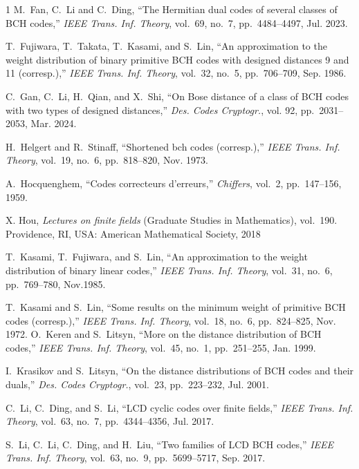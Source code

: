 \documentclass[journal,onecolumn]{IEEEtran}
\begin{document}
\begin{thebibliography}{1}
M.~Fan, C.~Li and C.~Ding, ``The Hermitian dual codes of several classes of
BCH codes,'' {\em IEEE Trans. Inf. Theory}, vol.~69, no.~7,
  pp.~4484--4497, Jul. 2023.



T.~Fujiwara, T.~Takata, T.~Kasami, and S.~Lin, ``An approximation to the weight
  distribution of binary primitive BCH codes with designed distances 9 and 11
  (corresp.),'' {\em IEEE Trans. Inf. Theory}, vol.~32, no.~5,
  pp.~706--709, Sep. 1986.

C.~Gan, C.~Li, H.~Qian, and X.~Shi, ``On Bose distance of a class of BCH codes
  with two types of designed distances,'' {\em Des. Codes Cryptogr.}, vol. 92, pp.~2031--2053, Mar. 2024.


     

H.~Helgert and R.~Stinaff, ``Shortened bch codes (corresp.),'' {\em IEEE Trans. Inf. Theory}, vol.~19, no.~6, pp.~818--820, Nov. 1973.

A.~Hocquenghem, ``Codes correcteurs d'erreurs,'' {\em Chiffers}, vol.~2,
  pp.~147--156, 1959.


X.  Hou, {\em Lectures on finite fields} (Graduate Studies in Mathematics), vol.~190.
Providence, RI, USA: American Mathematical Society, 2018



T.~Kasami, T.~Fujiwara, and S.~Lin, ``An approximation to the weight
  distribution of binary linear codes,'' {\em IEEE Trans. Inf. Theory}, vol.~31, no.~6, pp.~769--780, Nov.1985.

T.~Kasami and S.~Lin, ``Some results on the minimum weight of primitive BCH 
  codes (corresp.),'' {\em IEEE Trans. Inf. Theory}, vol.~18,
  no.~6, pp.~824--825, Nov. 1972.
O.~Keren and S.~Litsyn, ``More on the distance distribution of BCH codes,''
  {\em IEEE Trans. Inf. Theory}, vol.~45, no.~1, pp.~251--255,
  Jan. 1999.

I.~Krasikov and S.~Litsyn, ``On the distance distributions of BCH codes and
  their duals,'' {\em Des. Codes Cryptogr.}, vol.~23, pp.~223--232,
 Jul. 2001.




C.~Li, C.~Ding, and S.~Li, ``LCD cyclic codes over finite fields,'' {\em IEEE Trans. Inf. Theory}, vol.~63, no.~7, pp.~4344--4356, Jul. 2017.

S.~Li, C.~Li, C.~Ding, and H.~Liu, ``Two families of LCD BCH codes,'' {\em IEEE Trans. Inf. Theory}, vol.~63, no.~9, pp.~5699--5717, Sep. 2017.




\end{thebibliography}
\end{document}
